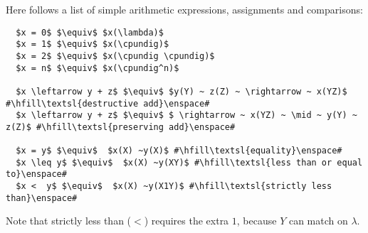Here follows a list of simple arithmetic expressions, assignments and comparisons:

\lstset{xleftmargin=.5in, xrightmargin=.5in} 
\begin{lstlisting}
  $x = 0$ $\equiv$ $x(\lambda)$
  $x = 1$ $\equiv$ $x(\cpundig)$
  $x = 2$ $\equiv$ $x(\cpundig \cpundig)$
  $x = n$ $\equiv$ $x(\cpundig^n)$
  
  $x \leftarrow y + z$ $\equiv$ $y(Y) ~ z(Z) ~ \rightarrow ~ x(YZ)$ #\hfill\textsl{destructive add}\enspace#
  $x \leftarrow y + z$ $\equiv$ $ \rightarrow ~ x(YZ) ~ \mid ~ y(Y) ~ z(Z)$ #\hfill\textsl{preserving add}\enspace#
  
  $x = y$ $\equiv$  $x(X) ~y(X)$ #\hfill\textsl{equality}\enspace#
  $x \leq y$ $\equiv$  $x(X) ~y(XY)$ #\hfill\textsl{less than or equal to}\enspace#
  $x <  y$ $\equiv$  $x(X) ~y(X1Y)$ #\hfill\textsl{strictly less than}\enspace#
\end{lstlisting}

Note that strictly less than (\(<\)) requires the extra \(1\), because \(Y\) can match on \(\lambda\).



